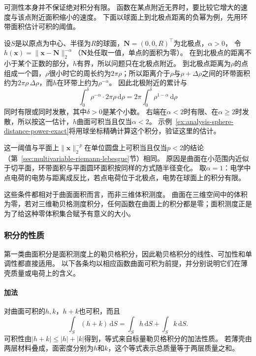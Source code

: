 可测性本身并不保证绝对积分有限。
函数在某点附近无界时，要比较它增大的速度与该点附近面积缩小的速度。
下面以球面上到北极点距离的负幂为例，先用环带面积估计可积的阈值。

\begin{example}[球面上距离负幂的可积阈值]
\label{ex:analysis-sphere-distance-power}
设$S$是以原点为中心、半径为$R$的球面，$\bm N=(0,0,R)^\top$为北极点，$\alpha>0$，
令$h(\bm x)=\lVert\bm x-\bm N\rVert_2^{-\alpha}$（$\bm N$处任取一值，单点的面积为零）。
在到北极点的距离不小于某个正数的部分，$h$有界，所以问题只在北极点附近。
到北极点距离为$\rho$的点组成一个圆，$\rho$很小时它的周长约为$2\pi\rho$；所以距离介于$\rho$与$\rho+\Delta\rho$之间的环带面积约为$2\pi\rho\,\Delta\rho$，而$h$在环带上约为$\rho^{-\alpha}$。
因此北极附近的累计与
\[
 \int_0^\delta\rho^{-\alpha}\cdot2\pi\rho\,\mathrm d\rho
 =2\pi\int_0^\delta\rho^{1-\alpha}\,\mathrm d\rho
\]
同时有限或同时发散，其中$\delta>0$是某个小数。
右端在$\alpha<2$时有限、在$\alpha\geq2$时发散，所以按这一估计，$h$曲面可积当且仅当$\alpha<2$。
示例~\ref{ex:analysis-sphere-distance-power-exact}将用球坐标精确计算这个积分，验证这里的估计。
\end{example}

这一阈值与平面上$\lVert\bm x\rVert_2^{-p}$在单位圆盘上可积当且仅当$p<2$的结论（第~\ref{sec:multivariable-riemann-lebesgue}节）相同。
原因是曲面在小范围内近似于切平面，环带面积与平面圆环面积按同样的方式随半径变化。
取$\alpha=1$：电学中点电荷的电势与距离成反比，若点电荷位于北极点，电势在球面上的积分有限。

这些条件都相对于曲面面积而言，而非三维体积测度。
曲面在三维空间中的体积为零，若对三维勒贝格测度积分，任何函数在曲面上的积分都是零；面积测度正是为了给这种零体积集合赋予有意义的大小。

\subsubsection{积分的性质}

第一类曲面积分是面积测度上的勒贝格积分，因此勒贝格积分的线性、可加性和单调性都直接适用。
以下各条均以相应函数曲面可积为前提，并分别说明它们在薄壳质量或电荷上的含义。

\paragraph{加法}

对曲面可积的$h,k$，$h+k$也可积，而且
\[
 \int_S(h+k)\,\mathrm dS=\int_Sh\,\mathrm dS+\int_Sk\,\mathrm dS.
\]
可积性由$|h+k|\leq|h|+|k|$得到，等式来自标量勒贝格积分的加法性质。
若薄壳由两层材料叠成，面密度分别为$h$和$k$，这个等式表示总质量等于两层质量之和。


